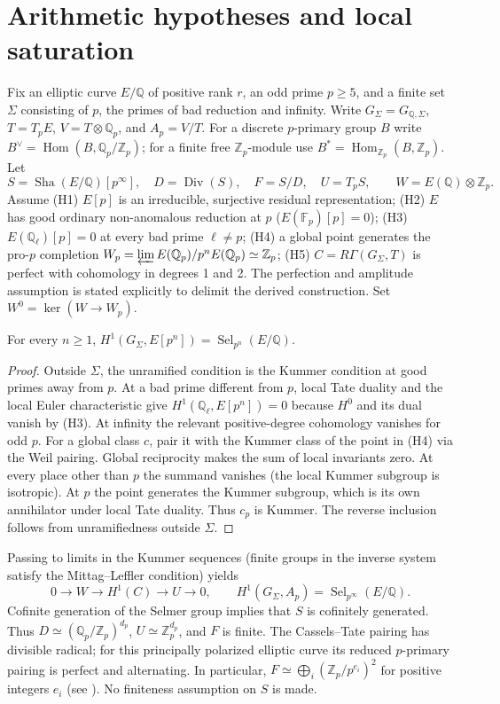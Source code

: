 \documentclass[11pt,a4paper]{article}
\newcommand{\Zp}{\mathbb Z_p}\newcommand{\Qp}{\mathbb Q_p}\newcommand{\Q}{\mathbb Q}\newcommand{\Sha}{\mathop{\mathrm{\mathit{\mathstrut Ш}}}} %
\renewcommand{\Sha}{\operatorname{Sha}}
\newcommand{\Sel}{\operatorname{Sel}}\newcommand{\rk}{\operatorname{rank}}\newcommand{\len}{\operatorname{length}}\newcommand{\coker}{\operatorname{coker}}\newcommand{\im}{\operatorname{im}}\newcommand{\Div}{\operatorname{Div}}\newcommand{\Ext}{\operatorname{Ext}}\newcommand{\Ann}{\operatorname{Ann}}\newcommand{\Tr}{\operatorname{tr}}\newcommand{\Fib}{\operatorname{Fib}}\newcommand{\Cone}{\operatorname{Cone}}
\begin{document}
\section{Arithmetic hypotheses and local saturation}
Fix an elliptic curve $E/\Q$ of positive rank $r$, an odd prime $p\geq5$, and a finite set $\Sigma$ consisting of $p$, the primes of bad reduction and infinity. Write $G_\Sigma=G_{\Q,\Sigma}$, $T=T_pE$, $V=T\otimes\Qp$, and $A_p=V/T$. For a discrete $p$-primary group $B$ write $B^\vee=\operatorname{Hom}(B,\Qp/\Zp)$; for a finite free $\Zp$-module use $B^*=\operatorname{Hom}_{\Zp}(B,\Zp)$. Let
\[
 S=\Sha(E/\Q)[p^\infty],\quad D=\Div(S),\quad F=S/D,\quad U=T_pS,
 \qquad W=E(\Q)\otimes\Zp.
\]
Assume (H1) $E[p]$ is an irreducible, surjective residual representation; (H2) $E$ has good ordinary non-anomalous reduction at $p$ ($E(\mathbb F_p)[p]=0$); (H3) $E(\Q_\ell)[p]=0$ at every bad prime $\ell\ne p$; (H4) a global point generates the pro-$p$ completion $W_p=\varprojlim E(\Q_p)/p^n E(\Q_p)\simeq\Zp$; (H5) $C=R\Gamma(G_\Sigma,T)$ is perfect with cohomology in degrees 1 and 2. The perfection and amplitude assumption is stated explicitly to delimit the derived construction. Set $W^0=\ker(W\to W_p)$.

\begin{proposition}\label{prop:sat}
For every $n\geq1$, $H^1(G_\Sigma,E[p^n])=\Sel_{p^n}(E/\Q)$.
\end{proposition}
\begin{proof}
Outside $\Sigma$, the unramified condition is the Kummer condition at good primes away from $p$. At a bad prime different from $p$, local Tate duality and the local Euler characteristic give $H^1(\Q_\ell,E[p^n])=0$ because $H^0$ and its dual vanish by (H3). At infinity the relevant positive-degree cohomology vanishes for odd $p$. For a global class $c$, pair it with the Kummer class of the point in (H4) via the Weil pairing. Global reciprocity makes the sum of local invariants zero. At every place other than $p$ the summand vanishes (the local Kummer subgroup is isotropic). At $p$ the point generates the Kummer subgroup, which is its own annihilator under local Tate duality. Thus $c_p$ is Kummer. The reverse inclusion follows from unramifiedness outside $\Sigma$.
\end{proof}

Passing to limits in the Kummer sequences (finite groups in the inverse system satisfy the Mittag--Leffler condition) yields
\begin{equation}\label{eq:kummer}
0\longrightarrow W\longrightarrow H^1(C)\longrightarrow U\longrightarrow0,
\qquad H^1(G_\Sigma,A_p)=\Sel_{p^\infty}(E/\Q).
\end{equation}
Cofinite generation of the Selmer group implies that $S$ is cofinitely generated. Thus $D\simeq(\Qp/\Zp)^{d_p}$, $U\simeq\Zp^{d_p}$, and $F$ is finite. The Cassels--Tate pairing has divisible radical; for this principally polarized elliptic curve its reduced $p$-primary pairing is perfect and alternating. In particular, $F\simeq\bigoplus_i(\Zp/p^{e_i})^2$ for positive integers $e_i$ (see \cite{milne}). No finiteness assumption on $S$ is made.
\newpage
\end{document}
